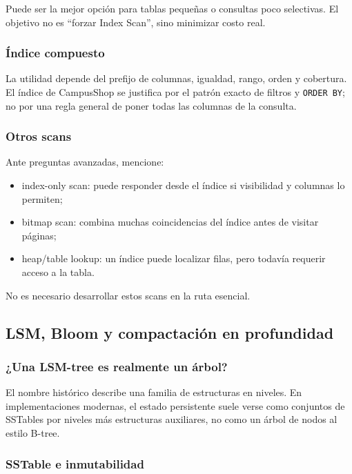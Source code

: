 \documentclass[variant=docente,cover=institutional,mode=screen]{ua-engineering-v6-article}
\begin{document}
Puede ser la mejor opción para tablas pequeñas o consultas poco selectivas. El objetivo no es ``forzar Index Scan'', sino minimizar costo real.

\subsubsection*{Índice compuesto}

La utilidad depende del prefijo de columnas, igualdad, rango, orden y cobertura. El índice de CampusShop se justifica por el patrón exacto de filtros y \texttt{ORDER BY}; no por una regla general de poner todas las columnas de la consulta.

\subsubsection*{Otros scans}

Ante preguntas avanzadas, mencione:

\begin{itemize}
\item index-only scan: puede responder desde el índice si visibilidad y columnas lo permiten;
\item bitmap scan: combina muchas coincidencias del índice antes de visitar páginas;
\item heap/table lookup: un índice puede localizar filas, pero todavía requerir acceso a la tabla.
\end{itemize}

No es necesario desarrollar estos scans en la ruta esencial.

\subsection{LSM, Bloom y compactación en profundidad}

\subsubsection*{¿Una LSM-tree es realmente un árbol?}

El nombre histórico describe una familia de estructuras en niveles. En implementaciones modernas, el estado persistente suele verse como conjuntos de SSTables por niveles más estructuras auxiliares, no como un árbol de nodos al estilo B-tree.

\subsubsection*{SSTable e inmutabilidad}
\end{document}
